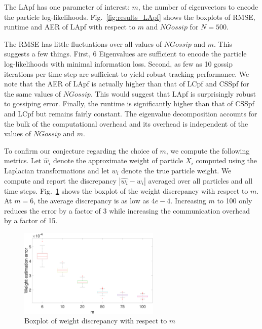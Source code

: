 \documentclass[10pt,letterpaper,final]{article}
\begin{document}
The LApf has one parameter of interest: $m$, the number of eigenvectors to encode the particle log-likelihoods. Fig.~\ref{fig:results_LApf} shows the boxplots of RMSE, runtime and AER of LApf with respect to $m$ and $NGossip$ for $N=500$. 

The RMSE has little fluctuations over all values of $NGossip$ and $m$. This suggests a few things. First, 6 Eigenvalues are sufficient to encode the particle log-likelihoods with minimal information loss. Second, as few as 10 gossip iterations per time step are sufficient to yield robust tracking performance. We note that the AER of LApf is actually higher than that of LCpf and CSSpf for the same values of $NGossip$. This would suggest that LApf is surprisingly robust to gossiping error. Finally, the runtime is significantly higher than that of CSSpf and LCpf but remains fairly constant.  The eigenvalue decomposition accounts for the bulk of the computational overhead and its overhead is independent of the values of $NGossip$ and $m$. 

To confirm our conjecture regarding the choice of $m$, we compute the following metrics. Let $\hat{w}_i$ denote the approximate weight of particle $X_i$ computed using the Laplacian transformations and let $w_i$ denote the true particle weight. We compute and report the discrepancy $|\hat{w_i}-w_i|$ averaged over all particles and all time steps. Fig.~\ref{fig:boxplot_LApf_weight_discrepancy} shows the boxplot of the weight discrepancy with respect to $m$. At $m=6$, the average discrepancy is as low as $4e-4$. Increasing $m$ to 100 only reduces the error by a factor of 3 while increasing the communication overhead by a factor of 15.  

\begin{figure}
\centering
\includegraphics[width=0.6\textwidth]{Figures/boxplot_LApf_weight_discrepancy}
\caption{Boxplot of weight discrepancy with respect to $m$}
\label{fig:boxplot_LApf_weight_discrepancy}
\end{figure}
\end{document}
